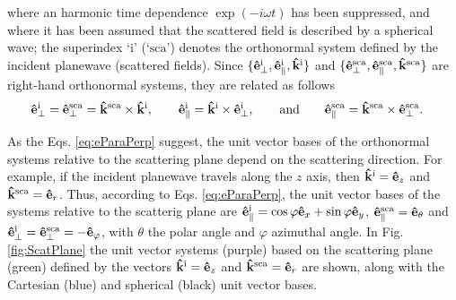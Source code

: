 %
where an harmonic time dependence $\exp(-i\omega t)$ has been suppressed, and where it has been assumed that the scattered field is described by a spherical wave; the superindex `$\text{i}$' (`$\text{sca}$') denotes the orthonormal system defined by the incident planewave (scattered fields).  Since $\{\vu{e}_\perp^\text{i}, \vu{e}_\parallel^\text{i},\vu{k}^\text{i} \}$ and $\{\vu{e}_\perp^\text{sca}, \vu{e}_\parallel^\text{sca},\vu{k}^\text{sca} \}$ are right-hand orthonormal systems, they are related as follows
%
 \begin{align}
	\vu{e}_\perp^\text{i} = \vu{e}_\perp^\text{sca}  & =  \vu{k}^\text{sca} \times \vu{k}^\text{i},
		\qquad
	\vu{e}^\text{i}_\parallel = \vu{k}^\text{i}\times \vu{e}^\text{i}_\perp,
		\qquad\text{and}\qquad
	\vu{e}^\text{sca}_\parallel = \vu{k}^\text{sca} \times \vu{e}_\perp^\text{sca}.
 \label{eq:eParaPerp}
 \end{align}
%

As the Eqs. \eqref{eq:eParaPerp} suggest, the unit vector bases of the orthonormal systems relative to the scattering plane depend on the scattering direction. For example, if the incident planewave travels along the $z$ axis, then $\vu{k}^\text{i} = \vu{e}_z$ and $\vu{k}^\text{sca} = \vu{e}_r$. Thus, according to Eqs. \eqref{eq:eParaPerp}, the unit vector bases of the systems relative to the scatterig plane are   $\vu{e}_\parallel^\text{i} = \cos\varphi \vu{e}_x +\sin\varphi \vu{e}_y$, $\vu{e}_\parallel^\text{sca} = \vu{e}_\theta$ and $\vu{e}_\perp^\text{i} = \vu{e}_\perp^\text{sca}  = - \vu{e}_\varphi$, with $\theta$ the polar angle and $\varphi$ azimuthal angle. In Fig. \ref{fig:ScatPlane} the unit vector systems (purple) based on the  scattering plane  (green) defined by the vectors $\vu{k}^\text{i}=\vu{e}_z$ and $\vu{k}^\text{sca} = \vu{e}_r$ are shown, along with the Cartesian (blue) and spherical (black) unit vector bases.

